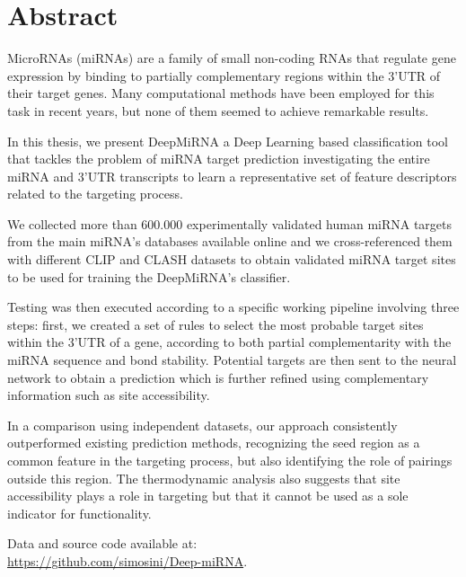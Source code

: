\chapter*{Abstract}

MicroRNAs (miRNAs) are a family of small non-coding RNAs that regulate gene expression by binding to partially complementary regions within the 3’UTR of their target genes. Many computational methods have been employed for this task in recent years, but none of them seemed to achieve remarkable results.

In this thesis, we present DeepMiRNA a Deep Learning based classification tool that  tackles the problem of miRNA target prediction investigating the entire miRNA and 3'UTR transcripts to learn a representative set of feature descriptors related to the targeting process. 

We collected more than 600.000 experimentally validated human miRNA targets from the main miRNA's databases available online and we cross-referenced them with different CLIP and CLASH datasets to obtain validated mi\-RNA target sites to be used for training the DeepMiRNA's classifier. 

Testing was then executed according to a specific working pipeline involving three steps: first, we created a set of rules to select the most probable target sites within the 3'UTR of a gene, according to both partial complementarity with the miRNA sequence and bond stability. Potential targets are then sent to the neural network to obtain a prediction which is further refined using complementary information such as site accessibility. 

In a comparison using independent datasets, our approach consistently outperformed existing prediction methods, recognizing the seed region as a common feature in the targeting process, but also identifying the role of pairings outside this region. The thermodynamic analysis also suggests that site accessibility plays a role in targeting but that it cannot be used as a sole indicator for functionality.

Data and source code available at: \\ 
\url{https://github.com/simosini/Deep-miRNA}.